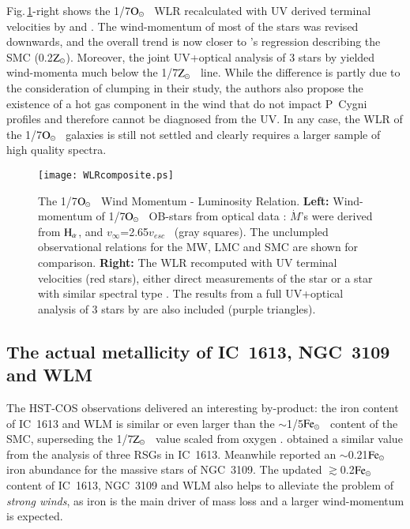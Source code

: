 \documentclass{iau}
\newcommand{\Osun}{$\rm O_{\odot}$}
\newcommand{\Fesun}{$\rm Fe_{\odot}$}
\newcommand{\Zsun}{$\rm Z_{\odot}$}
\newcommand{\vinf}{\mbox{$v_{\infty}$}}
\newcommand{\vesc}{\mbox{$v_{esc}$}}
\newcommand{\Mdot}{$\dot M$}
\newcommand{\halpha}{$\rm H_{\alpha}$}
\begin{document}
Fig.\,\ref{F:WLR}-right shows the 1/7\Osun~ WLR
recalculated with UV derived terminal velocities
by \citet{Gal14} and \citet{Bal15}.
The wind-momentum of most of the stars was revised downwards,
and the overall trend is now closer to
\citet{Mal07b}'s regression describing the SMC (0.2\Zsun).
Moreover, the joint UV+optical analysis of 3 stars by \citet{Bal15}
yielded wind-momenta much below the 1/7\Zsun~ line.
While the difference is partly due to the consideration
of clumping in their study, the authors also propose
the existence of a hot gas component in the wind that do not
impact P~Cygni profiles and therefore cannot be diagnosed from the UV.
In any case, the WLR of the 1/7\Osun~ galaxies
is still not settled and clearly requires a larger sample
of high quality spectra.

\begin{figure}[t]
\begin{center}
 \texttt{[image: WLRcomposite.ps]} 
 \caption{The 1/7\Osun~ Wind Momentum - Luminosity Relation. %
   \textbf{Left:} Wind-momentum of 1/7\Osun~ OB-stars from optical data
   \citep{Hal12,Tral11,Tal14}:
   \Mdot's were derived from \halpha, and \vinf=2.65\vesc~ (gray squares).
   The unclumpled observational relations for the MW, LMC and SMC  \citep{Mal07b}
   are shown for comparison.
   \textbf{Right:} The WLR recomputed with
   UV terminal velocities (red stars), either direct measurements of the star or
   a star with similar spectral type \citep[from][]{Gal14,Bal15}.
   The results from a full UV+optical analysis of 3 stars by \citet{Bal15} are also included
   (purple triangles).
 }
   \label{F:WLR}
\end{center}
\end{figure}


\subsection{The actual metallicity of IC~1613, NGC~3109 and WLM}
\label{ss:meta}

The HST-COS observations delivered an interesting by-product:
the iron content of IC~1613 and WLM is similar or even larger than the $\sim$1/5\Fesun~ content of the SMC,
superseding the 1/7\Zsun~ value scaled from oxygen
\citep{Gal14,Bal15}.
\citet{Tal07} obtained a similar value from the analysis of three RSGs in IC~1613.
Meanwhile \citet{Hal14} reported an $\sim$0.21\Fesun~ iron abundance  %
for the massive stars of NGC~3109.
The updated $\gtrsim$0.2\Fesun~ content of IC~1613, NGC~3109 and WLM
also helps to alleviate the problem of \textit{strong winds},
as iron is the main driver of mass loss \citep[e.g.][]{VKL01} and a larger wind-momentum is expected.
\end{document}
